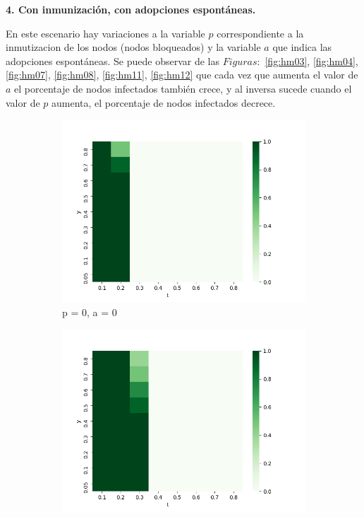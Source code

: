 \documentclass{article}
\begin{document}
\newpage
\textbf{4. Con inmunización, con adopciones espontáneas.}

En este escenario hay variaciones a la variable $p$ correspondiente a la inmutizacion de los nodos (nodos bloqueados) y la variable $a$ que indica las adopciones espontáneas. Se puede observar de las $Figuras: $ \ref{fig:hm03}, \ref{fig:hm04}, \ref{fig:hm07}, \ref{fig:hm08}, \ref{fig:hm11}, \ref{fig:hm12} que cada vez que aumenta el valor de $a$ el porcentaje de nodos infectados también crece, y al inversa sucede cuando el valor de $p$ aumenta, el porcentaje de nodos infectados decrece.
\begin{figure}[h]
	\begin{subfigure}[b]{0.5\textwidth}
		\includegraphics[width=\textwidth]{../Images/hm09.png}
		\caption{p = 0, a = 0}
		\label{fig:hm09}
	\end{subfigure}
	\hfill
	\begin{subfigure}[b]{0.5\textwidth}
		\includegraphics[width=\textwidth]{../Images/hm10.png}

\end{subfigure}
\end{figure}
\end{document}
